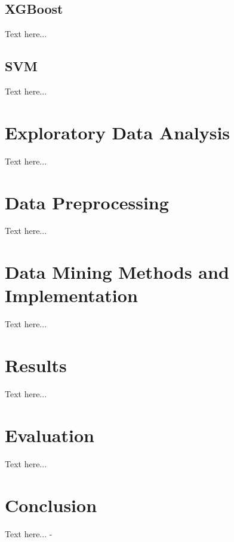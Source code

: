 \documentclass{sigkddExp}
\begin{document}
\subsection{XGBoost}
Text here...
\subsection{SVM}
Text here...

\section{Exploratory Data Analysis}
Text here...

\section{Data Preprocessing}
Text here...

\section{Data Mining Methods and Implementation}
Text here...

\section{Results}
Text here...

\section{Evaluation}
Text here...

\section{Conclusion}
Text here...
-

%



\end{document}
